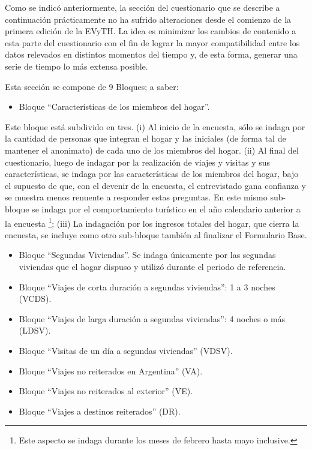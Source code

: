 \documentclass[
  openany]{book}
\providecommand{\tightlist}{%
  \setlength{\itemsep}{0pt}\setlength{\parskip}{0pt}}
\begin{document}
Como se indicó anteriormente, la sección del cuestionario que se describe a continuación prácticamente no ha sufrido alteraciones desde el comienzo de la primera edición de la EVyTH.
La idea es minimizar los cambios de contenido a esta parte del cuestionario con el fin de lograr la mayor compatibilidad entre los datos relevados en distintos momentos del tiempo y, de esta forma, generar una serie de tiempo lo más extensa posible.

Esta sección se compone de 9 Bloques; a saber:

\begin{itemize}
\tightlist
\item
  Bloque ``Características de los miembros del hogar''.
\end{itemize}

Este bloque está subdivido en tres.
(i) Al inicio de la encuesta, sólo se indaga por la cantidad de personas que integran el hogar y las iniciales (de forma tal de mantener el anonimato) de cada uno de los miembros del hogar.
(ii) Al final del cuestionario, luego de indagar por la realización de viajes y visitas y sus características, se indaga por las características de los miembros del hogar, bajo el supuesto de que, con el devenir de la encuesta, el entrevistado gana confianza y se muestra menos renuente a responder estas preguntas.
En este mismo sub-bloque se indaga por el comportamiento turístico en el año calendario anterior a la encuesta \footnote{Este aspecto se indaga durante los meses de febrero hasta mayo inclusive.}; (iii) La indagación por los ingresos totales del hogar, que cierra la encuesta, se incluye como otro sub-bloque también al finalizar el Formulario Base.

\begin{itemize}
\item
  Bloque ``Segundas Viviendas''.
  Se indaga únicamente por las segundas viviendas que el hogar dispuso y utilizó durante el periodo de referencia.
\item
  Bloque ``Viajes de corta duración a segundas viviendas'': 1 a 3 noches (VCDS).
\item
  Bloque ``Viajes de larga duración a segundas viviendas'': 4 noches o más (LDSV).
\item
  Bloque ``Visitas de un día a segundas viviendas'' (VDSV).
\item
  Bloque ``Viajes no reiterados en Argentina'' (VA).
\item
  Bloque ``Viajes no reiterados al exterior'' (VE).
\item
  Bloque ``Viajes a destinos reiterados'' (DR).
\end{itemize}
\end{document}

